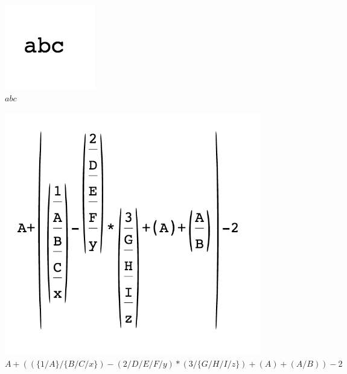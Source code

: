 \begin{figure}[H]
      \begin{centering}
        \includegraphics{imgs/g}
        \caption{$abc$}
       \end{centering}
\end{figure}
\begin{figure}[H]
      \begin{centering}
        \includegraphics{imgs/h}
        \caption{$A+((\{1/A\}/\{B/C/x\})-(2/D/E/F/y)*(3/\{G/H/I/z\})+(A)+(A/B))-2$}
       \end{centering}
\end{figure}

